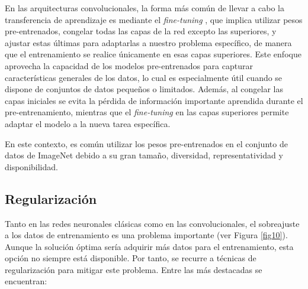 En las arquitecturas convolucionales, la forma más común de llevar a cabo la transferencia de aprendizaje es mediante el \textit{fine-tuning} \cite{39}, que implica utilizar pesos pre-entrenados, congelar todas las capas de la red excepto las superiores, y ajustar estas últimas para adaptarlas a nuestro problema específico, de manera que el entrenamiento se realice únicamente en esas capas superiores. Este enfoque aprovecha la capacidad de los modelos pre-entrenados para capturar características generales de los datos, lo cual es especialmente útil cuando se dispone de conjuntos de datos pequeños o limitados. Además, al congelar las capas iniciales se evita la pérdida de información importante aprendida durante el pre-entrenamiento, mientras que el \textit{fine-tuning} en las capas superiores permite adaptar el modelo a la nueva tarea específica.

En este contexto, es común utilizar los pesos pre-entrenados en el conjunto de datos de ImageNet \cite{50} debido a su gran tamaño, diversidad, representatividad y disponibilidad.


\subsection{Regularización}\label{regularizacion}
Tanto en las redes neuronales clásicas como en las convolucionales, el sobreajuste a los datos de entrenamiento es una problema importante (ver Figura \ref{fig10}). Aunque la solución óptima sería adquirir más datos para el entrenamiento, esta opción no siempre está disponible. Por tanto, se recurre a técnicas de regularización para mitigar este problema. Entre las más destacadas se encuentran:


